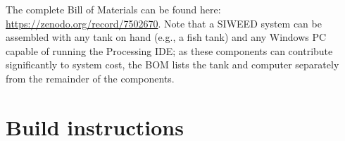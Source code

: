 \documentclass[11pt, letterpaper]{article}
\begin{document}

The complete Bill of Materials can be found here: \href{https://zenodo.org/record/7502670}{https://zenodo.org/record/7502670}. Note that a SIWEED system can be assembled with any tank on hand (e.g., a fish tank) and any Windows PC capable of running the Processing IDE; as these components can contribute significantly to system cost, the BOM lists the tank and computer separately from the remainder of the components.
%

\section{Build instructions}
\end{document}
